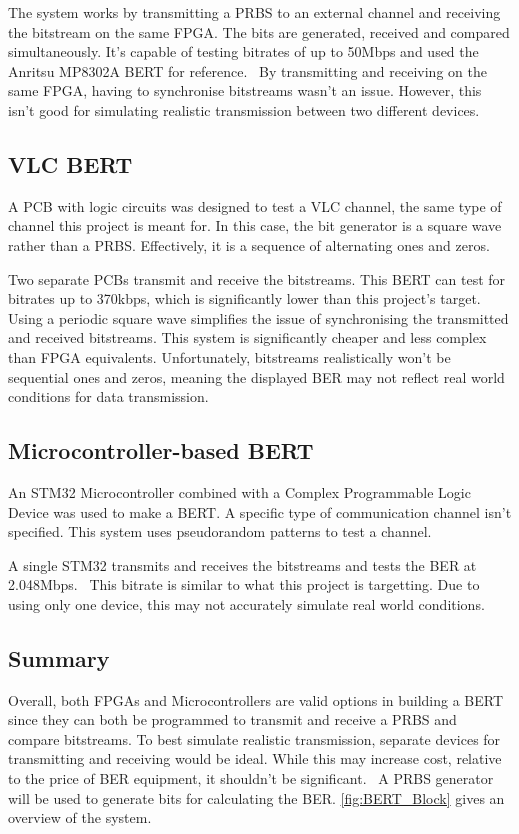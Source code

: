 \documentclass[12pt]{project_report}
\begin{document}
        The system works by transmitting a PRBS to an external channel and receiving the bitstream on the same FPGA.\@
        The bits are generated, received and compared simultaneously.
        It's capable of testing bitrates of up to 50Mbps and used the Anritsu MP8302A BERT for reference.~\cite{MJBasford2020}
        By transmitting and receiving on the same FPGA, having to synchronise bitstreams wasn't an issue.
        However, this isn't good for simulating realistic transmission between two different devices.
    
    \subsection{VLC BERT}
        A PCB with logic circuits was designed to test a VLC channel, the same type of channel this project is meant for.
        In this case, the bit generator is a square wave rather than a PRBS.\@
        Effectively, it is a sequence of alternating ones and zeros.~\cite{SChatterjee2023}

        Two separate PCBs transmit and receive the bitstreams.
        This BERT can test for bitrates up to 370kbps, which is significantly lower than this project's target.
        Using a periodic square wave simplifies the issue of synchronising the transmitted and received bitstreams.
        This system is significantly cheaper and less complex than FPGA equivalents.
        Unfortunately, bitstreams realistically won't be sequential ones and zeros, meaning the displayed BER may not reflect real world conditions for data transmission.~\cite{SChatterjee2023}
    
    \subsection{Microcontroller-based BERT}
        An STM32 Microcontroller combined with a Complex Programmable Logic Device was used to make a BERT.\@
        A specific type of communication channel isn't specified.
        This system uses pseudorandom patterns to test a channel.~\cite{NMarda2014}

        A single STM32 transmits and receives the bitstreams and tests the BER at\\2.048Mbps.~\cite{NMarda2014}
        This bitrate is similar to what this project is targetting.
        Due to using only one device, this may not accurately simulate real world conditions.

    \subsection{Summary}
        Overall, both FPGAs and Microcontrollers are valid options in building a BERT since they can both be programmed to transmit and receive a PRBS and compare bitstreams.
        To best simulate realistic transmission, separate devices for transmitting and receiving would be ideal.
        While this may increase cost, relative to the price of BER equipment, it shouldn't be significant.~\cite{MJBasford2020,SChatterjee2023}
        A PRBS generator will be used to generate bits for calculating the BER.\@
        \autoref{fig:BERT_Block} gives an overview of the system.
\end{document}
